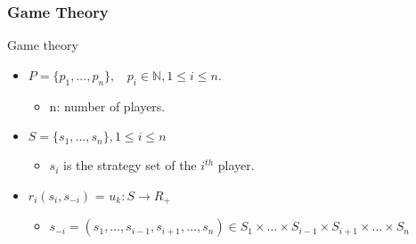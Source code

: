 \subsubsection{Game Theory}
\begin{frame}{Game theory}{}
	\begin{itemize}
		\item $P= \{p_{1}, ... , p_{n}\}, ~~~~ p_{i} \in \mathbb{N}, 1\leq i\leq n.$
		\begin{itemize}
			\item n: number of players.
		\end{itemize}
		\item $S =\{s_{1}, ...,  s_{n}\}, 1\leq i\leq n$ 
		\begin{itemize}
			\item $s_{i}$ is the strategy set of the $i^{th}$ player.
		\end{itemize}
		\item $r_{i} (s_{i} , s_{-i})$ = $u_{k} : S \longrightarrow R_{+}$
		\begin{itemize}
			\item $s_{-i}=\left(s_{1}, \dots, s_{i-1}, s_{i+1}, \ldots, s_{n}\right) \in S_{1} \times \ldots \times S_{i-1} \times S_{i+1} \times \ldots \times S_{n}$
		\end{itemize}
	\end{itemize}
 \end{frame}





